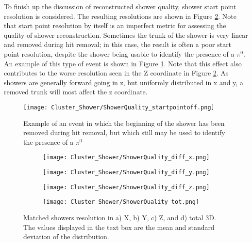 To finish up the discussion of reconstructed shower quality, shower start point resolution is considered.  The resulting resolutions are shown in Figure \ref{fig:showerquality_xyzres}. Note that start point resolution by itself is an imperfect metric for assessing the quality of shower reconstruction. Sometimes the trunk of the shower is very linear and removed during hit removal; in this case, the result is often a poor start point resolution, despite the shower being usable to identify the presence of a $\pi^0$. An example of this type of event is shown in Figure \ref{fig:showerquality_startpointoff}.  Note that this effect also contributes to the worse resolution seen in the Z coordinate in Figure \ref{fig:showerquality_xyzres}. As showers are generally forward going in z, but uniformly distributed in x and y, a removed trunk will most affect the z coordinate.

\begin{figure}[h!]
\centering
\texttt{[image: Cluster\_Shower/ShowerQuality\_startpointoff.png]}
\caption{Example of an event in which the beginning of the shower has been removed during hit removal, but which still may be used to identify the presence of a $\pi^0$ }
\label{fig:showerquality_startpointoff}
\end{figure}

\begin{figure}[h!]
\centering
  \begin{subfigure}[t]{0.45\textwidth}
    \centering
\texttt{[image: Cluster\_Shower/ShowerQuality\_diff\_x.png]}
  \caption{ }
  \end{subfigure} 
  \hspace{5mm}
  \begin{subfigure}[t]{0.45\textwidth}
    \centering
\texttt{[image: Cluster\_Shower/ShowerQuality\_diff\_y.png]}
  \caption{ }
  \end{subfigure} 
  \hspace{5mm}
  \begin{subfigure}[t]{0.45\textwidth}
    \centering
\texttt{[image: Cluster\_Shower/ShowerQuality\_diff\_z.png]}
  \caption{ }
  \end{subfigure} 
  \hspace{5mm}
  \begin{subfigure}[t]{0.45\textwidth}
    \centering
\texttt{[image: Cluster\_Shower/ShowerQuality\_tot.png]}
  \caption{ }
  \end{subfigure} 
\caption{ Matched showers resolution in a) X, b) Y, c) Z, and d) total 3D. The values displayed in the text box are the mean and standard deviation of the distribution. }
\label{fig:showerquality_xyzres}
\end{figure}

